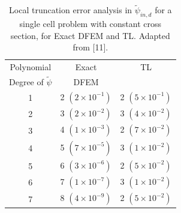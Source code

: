 \begin{table}[!hbp]
\centering
\caption{Local truncation error analysis in $\widetilde{\psi}_{in,d}$ for a single cell problem with constant cross section, for Exact DFEM and TL.  Adapted from [11].}
\begin{tabular}{|c|c|c|} 
\hline
  Polynomial 										  & Exact 										&	 TL                   \\
  Degree  of $\widetilde{\psi}$		&   DFEM										& {}	                  \\
	\hline
				1   											&  2 $(2\times 10^{-1})$		& 2 $(5\times 10^{-1})$		\\
		\hline
				2   											&  3  $(2\times 10^{-2})$		&	3 $(4\times 10^{-2})$	\\
		\hline	
				3   											&  4 $(1\times 10^{-3})$		& 2 $(7\times 10^{-2})$	\\
		\hline
				4   											&  5 $(7\times 10^{-5})$		& 3 $(1\times 10^{-2})$	\\
		\hline	
				5   											&  6 $(3\times 10^{-6})$		& 2 $(5\times 10^{-2})$	\\
		\hline		
				6   											&  7 $(1\times 10^{-7})$		& 3 $(1\times 10^{-2})$	\\
		\hline		
				7   											&  8 $(4\times 10^{-9})$		& 2 $(5\times 10^{-2})$	\\
		\hline		
\end{tabular}
\label{tbl:taylor_in_part1} 
\end{table}
